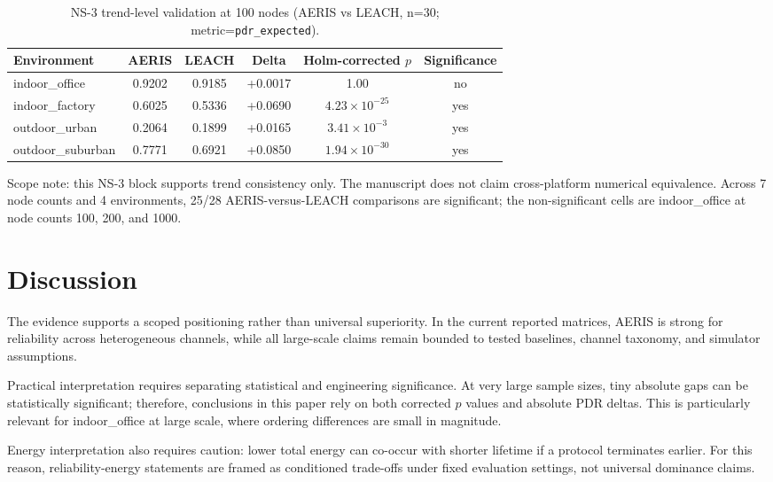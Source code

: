 \documentclass[sensors,article,submit,moreauthors,pdftex]{Definitions/mdpi}
\begin{document}
\begin{table}[H]
\caption{NS-3 trend-level validation at 100 nodes (AERIS vs LEACH, n=30; metric=\texttt{pdr\_expected}).}
\label{tab:ns3_trend}
\centering
\begin{tabular}{lccccc}
\toprule
Environment & AERIS & LEACH & Delta & Holm-corrected $p$ & Significance \\
\midrule
indoor\_office    & 0.9202 & 0.9185 & +0.0017 & 1.00 & no \\
indoor\_factory   & 0.6025 & 0.5336 & +0.0690 & $4.23\times10^{-25}$ & yes \\
outdoor\_urban    & 0.2064 & 0.1899 & +0.0165 & $3.41\times10^{-3}$ & yes \\
outdoor\_suburban & 0.7771 & 0.6921 & +0.0850 & $1.94\times10^{-30}$ & yes \\
\bottomrule
\end{tabular}
\end{table}

Scope note: this NS-3 block supports trend consistency only. The manuscript does not claim cross-platform numerical equivalence. Across 7 node counts and 4 environments, 25/28 AERIS-versus-LEACH comparisons are significant; the non-significant cells are indoor\_office at node counts 100, 200, and 1000.

\section{Discussion}
The evidence supports a scoped positioning rather than universal superiority. In the current reported matrices, AERIS is strong for reliability across heterogeneous channels, while all large-scale claims remain bounded to tested baselines, channel taxonomy, and simulator assumptions.

Practical interpretation requires separating statistical and engineering significance. At very large sample sizes, tiny absolute gaps can be statistically significant; therefore, conclusions in this paper rely on both corrected $p$ values and absolute PDR deltas. This is particularly relevant for indoor\_office at large scale, where ordering differences are small in magnitude.

Energy interpretation also requires caution: lower total energy can co-occur with shorter lifetime if a protocol terminates earlier. For this reason, reliability-energy statements are framed as conditioned trade-offs under fixed evaluation settings, not universal dominance claims.
\end{document}
